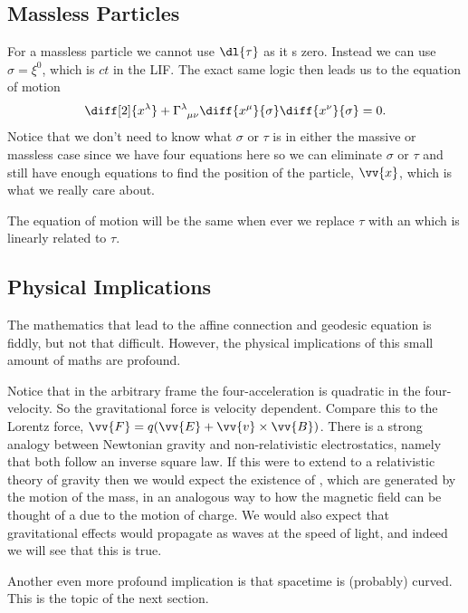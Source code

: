 \documentclass[fleqn]{NotesClass}
\newcommand*{\christoffel}[3]{\tensor{\Gamma}{^{#1}_{{#2}{#3}}}}
\begin{document}
    \subsection{Massless Particles}
    For a massless particle we cannot use \(\dl{\tau}\) as it s zero.
    Instead we can use \(\sigma = \xi^0\), which is \(ct\) in the LIF.
    The exact same logic then leads us to the equation of motion
    \begin{equation}
        \diff[2]{x^\lambda} + \christoffel{\lambda}{\mu}{\nu} \diff{x^\mu}{\sigma} \diff{x^\nu}{\sigma} = 0.
    \end{equation}
    Notice that we don't need to know what \(\sigma\) or \(\tau\) is in either the massive or massless case since we have four equations here so we can eliminate \(\sigma\) or \(\tau\) and still have enough equations to find the position of the particle, \(\vv{x}\), which is what we really care about.
    
    The equation of motion will be the same when ever we replace \(\tau\) with an  which is linearly related to \(\tau\).
    
    \subsection{Physical Implications}
    The mathematics that lead to the affine connection and geodesic equation is fiddly, but not that difficult.
    However, the physical implications of this small amount of maths are profound.
    
    Notice that in the arbitrary frame the four-acceleration is quadratic in the four-velocity.
    So the gravitational force is velocity dependent.
    Compare this to the Lorentz force, \(\vv{F} = q(\vv{E} + \vv{v} \times \vv{B})\).
    There is a strong analogy between Newtonian gravity and non-relativistic electrostatics, namely that both follow an inverse square law.
    If this were to extend to a relativistic theory of gravity then we would expect the existence of , which are generated by the motion of the mass, in an analogous way to how the magnetic field can be thought of a due to the motion of charge.
    We would also expect that gravitational effects would propagate as waves at the speed of light, and indeed we will see that this is true.
    
    Another even more profound implication is that spacetime is (probably) curved.
    This is the topic of the next section.
    
\end{document}
